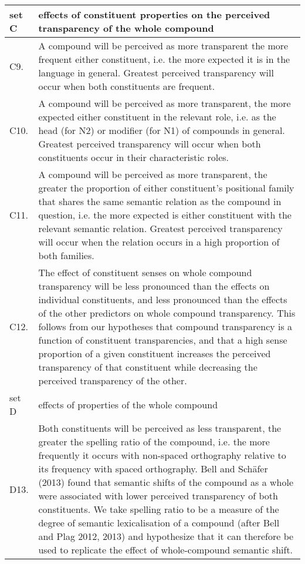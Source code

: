 \begin{table}[p]
\small
\begin{tabularx}{\textwidth}{lQ}
\lsptoprule
{set C}&{effects of constituent properties on the perceived transparency of the whole compound}\\ \midrule %
C9.&A compound will be perceived as more transparent the more frequent either constituent, i.e. the more expected it is in the language in general. Greatest perceived transparency will occur when both constituents are frequent.\\
C10.&A compound will be perceived as more transparent, the more expected either constituent in the relevant role, i.e. as the head (for N2) or modifier (for N1) of compounds in general. Greatest perceived transparency will occur when both constituents occur in their characteristic roles.\\
C11.&A compound will be perceived as more transparent, the greater the proportion of either constituent’s positional family that shares the same semantic relation as the compound in question, i.e. the more expected is either constituent with the relevant semantic relation. Greatest perceived transparency will occur when the relation occurs in a high proportion of both families.\\
C12.&The effect of constituent senses on whole compound transparency will be less pronounced than the effects on individual constituents, and less pronounced than the effects of the other predictors on whole compound transparency. This follows from our hypotheses that compound transparency is a function of constituent transparencies, and that a high sense proportion of a given constituent increases the perceived transparency of that constituent while decreasing the perceived transparency of the other.\\ \tablevspace %
{set D}&{effects of properties of the whole compound}\\\midrule %
D13.&Both constituents will be perceived as less transparent, the greater the spelling ratio of the compound, i.e. the more frequently it occurs with non-spaced orthography relative to its frequency with spaced orthography. Bell and Schäfer (2013) found that semantic shifts of the compound as a whole were associated with lower perceived transparency of both constituents. We take spelling ratio to be a measure of the degree of semantic lexicalisation of a compound (after Bell and Plag 2012, 2013) and hypothesize that it can therefore be used to replicate the effect of whole-compound semantic shift.\\

\end{tabularx}
\end{table}
